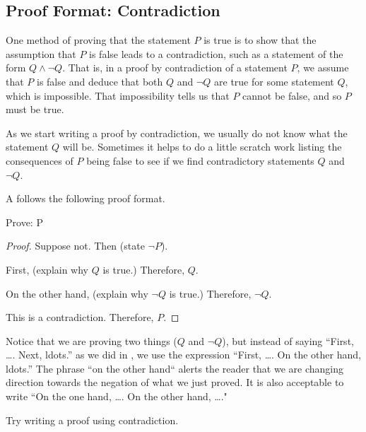 \newcommand{\subpffcontra}{Proof Format: Contradiction}
\subsection{\subpffcontra}
\label{sub_pff_contra}

One method of proving that the statement $P$ is true is to show that the assumption that $P$ is false leads to a contradiction, such as a statement of the form $Q \land \neg Q$.  That is, in a proof by contradiction of a statement $P$, we assume that $P$ is false and deduce that both $Q$ and $\neg Q$ are true for some statement $Q$, which is impossible. That impossibility tells us that $P$ cannot be false, and so $P$ must be true.  

As we start writing a proof by contradiction, we usually do not know what the statement $Q$ will be.  Sometimes it helps to do a little scratch work listing the consequences of $P$ being false to see if we find contradictory statements $Q$ and $\neg Q$.

A  follows the following proof format.

\begin{pff}
\label{pff_contradiction}
    Prove: P
        \begin{proof}
            Suppose not. Then (state $\neg P$).

            First, (explain why $Q$ is true.)  Therefore, $Q$.

            On the other hand, (explain why $\neg Q$ is true.) Therefore, $\neg Q$.

            This is a contradiction. Therefore, $P$.
        \end{proof}
\end{pff}

Notice that we are proving two things ($Q$ and $\neg Q$), but instead of saying ``First, \ldots. Next, ldots.'' as we did in , we use the expression ``First, \ldots. On the other hand, ldots.'' The phrase ``on the other hand`` alerts the reader that we are changing direction towards the negation of what we just proved.  It is also acceptable to write ``On the one hand, \ldots. On the other hand, \ldots."

Try writing a proof using contradiction.

